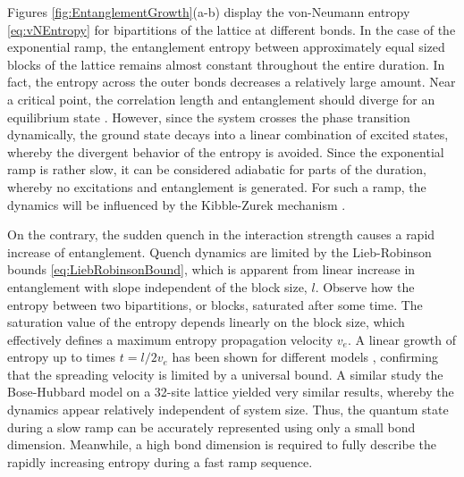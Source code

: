 Figures \ref{fig:EntanglementGrowth}(a-b) display the von-Neumann entropy \eqref{eq:vNEntropy} for bipartitions of the lattice at different bonds.
In the case of the exponential ramp, the entanglement entropy between approximately equal sized blocks of the lattice remains almost constant throughout the entire duration. In fact, the entropy across the outer bonds decreases a relatively large amount. Near a critical point, the correlation length and entanglement should diverge for an equilibrium state \cite{Zurek2005}. However, since the system crosses the phase transition dynamically, the ground state decays into a linear combination of excited states, whereby the divergent behavior of the entropy is avoided. Since the exponential ramp is rather slow, it can be considered adiabatic for parts of the duration, whereby no excitations and entanglement is generated. For such a ramp, the dynamics will be influenced by the Kibble-Zurek mechanism \cite{Braun2015}.

On the contrary, the sudden quench in the interaction strength causes a rapid increase of entanglement. Quench dynamics are limited by the Lieb-Robinson bounds \eqref{eq:LiebRobinsonBound}, which is apparent from linear increase in entanglement with slope independent of the block size, $l$. Observe how the entropy between two bipartitions, or blocks, saturated after some time. The saturation value of the entropy depends linearly on the block size, which effectively defines a maximum entropy propagation velocity $v_e$. A linear growth of entropy up to times $t = l/2 v_e$ has been shown for different models \cite{Lauchli2008,Eisert2006,Amico2008,Calabrese2005}, confirming that the spreading velocity is limited by a universal bound. A similar study the Bose-Hubbard model on a 32-site lattice \cite{Lauchli2008} yielded very similar results, whereby the dynamics appear relatively independent of system size.
Thus, the quantum state during a slow ramp can be accurately represented using only a small bond dimension. Meanwhile, a high bond dimension is required to fully describe the rapidly increasing entropy during a fast ramp sequence. \\

